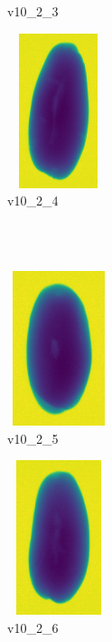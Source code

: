 \documentclass[11pt]{article}
\begin{document}
\begin{figure}
\begin{subfigure}[b]{0.15\textwidth}
        \caption{v10\_2\_3}
         \label{fig:five over x}
     \end{subfigure}
     \hfill
     \begin{subfigure}[b]{0.15\textwidth}
         \centering
         \includegraphics[width=3cm, height=4.5cm]{images/kartofler/v10_2_0_cut.png}
         \caption{v10\_2\_4}
         \label{fig:y equals x}
     \end{subfigure}
    \\ \\
     \begin{subfigure}[b]{0.15\textwidth}
         \centering
         \includegraphics[width=3cm, height=4.5cm]{images/kartofler/v10_2_1_cut.png}
        \caption{v10\_2\_5}
         \label{fig:three sin x}
     \end{subfigure}
     \hfill
     \begin{subfigure}[b]{0.15\textwidth}
         \centering
         \includegraphics[width=3cm, height=4.5cm]{images/kartofler/v10_2_2_cut.png}
        \caption{v10\_2\_6}
         \label{fig:five over x}
     \end{subfigure}
     \hfill
    \begin{subfigure}[b]{0.15\textwidth}

\end{subfigure}
\end{figure}
\end{document}
